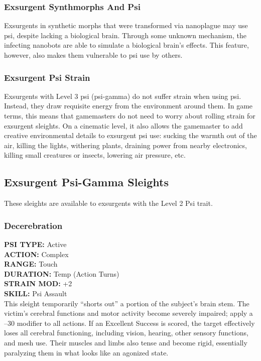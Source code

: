 \subsubsection{Exsurgent Synthmorphs And Psi} 

Exsurgents in synthetic morphs that were transformed via nanoplague may use psi, despite lacking a biological brain. Through some unknown mechanism, the infecting nanobots are able to simulate a biological brain's effects. This feature, however, also makes them vulnerable to psi use by others. 

\subsubsection{Exsurgent Psi Strain} 

Exsurgents with Level 3 psi (psi-gamma) do not suffer strain when using psi. Instead, they draw requisite energy from the environment around them. In game terms, this means that gamemasters do not need to worry about rolling strain for exsurgent sleights. On a cinematic level, it also allows the gamemaster to add creative environmental details to exsurgent psi use: sucking the warmth out of the air, killing the lights, withering plants, draining power from nearby electronics, killing small creatures or insects, lowering air pressure, etc. 

\subsection{Exsurgent Psi-Gamma Sleights } 

These sleights are available to exsurgents with the Level 2 Psi trait. 

\subsubsection{Decerebration } \textbf{PSI TYPE:} Active \\ \textbf{ACTION:} Complex \\ \textbf{RANGE:} Touch \\ \textbf{DURATION:} Temp (Action Turns) \\ \textbf{STRAIN MOD:} +2 \\ \textbf{SKILL:} Psi Assault \\ This sleight temporarily ``shorts out'' a portion of the subject's brain stem. The victim's cerebral functions and motor activity become severely impaired; apply a –30 modifier to all actions. If an Excellent Success is scored, the target effectively loses all cerebral functioning, including vision, hearing, other sensory functions, and mesh use. Their muscles and limbs also tense and become rigid, essentially paralyzing them in what looks like an agonized state. 

